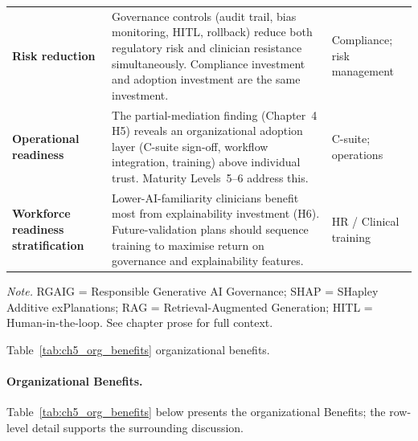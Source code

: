 {\begin{xltabular}{\textwidth}{@{} >{\raggedright\arraybackslash}p{2.2cm} L >{\raggedright\arraybackslash}p{2.4cm} @{}}
\textbf{Risk reduction} & Governance controls (audit trail, bias monitoring, HITL, rollback) reduce both regulatory risk and clinician resistance simultaneously. Compliance investment and adoption investment are the same investment. & Compliance; risk management \\
\textbf{Operational readiness} & The partial-mediation finding (Chapter~4 H5) reveals an organizational adoption layer (C-suite sign-off, workflow integration, training) above individual trust. Maturity Levels~5--6 address this. & C-suite; operations \\
\textbf{Workforce readiness stratification} & Lower-AI-familiarity clinicians benefit most from explainability investment (H6). Future-validation plans should sequence training to maximise return on governance and explainability features. & HR / Clinical training \\
\end{xltabular}}
\vspace{0.3em}\noindent\textit{Note.} RGAIG = Responsible Generative AI Governance; SHAP = SHapley Additive exPlanations; RAG = Retrieval-Augmented Generation; HITL = Human-in-the-loop. See chapter prose for full context.

\noindent Table~\ref{tab:ch5_org_benefits} organizational benefits.

\paragraph{Organizational Benefits.}


\noindent Table~\ref{tab:ch5_org_benefits} below presents the organizational Benefits; the row-level detail supports the surrounding discussion.

